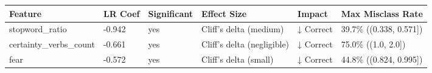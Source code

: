\begin{tabular}{llllll}
\toprule
Feature & LR Coef & Significant & Effect Size & Impact & Max Misclass Rate \\
\midrule
stopword\_ratio & -0.942 & yes & Cliff's delta (medium) & ↓ Correct & 39.7\% ((0.338, 0.571]) \\
certainty\_verbs\_count & -0.661 & yes & Cliff's delta (negligible) & ↓ Correct & 75.0\% ((1.0, 2.0]) \\
fear & -0.572 & yes & Cliff's delta (small) & ↓ Correct & 44.8\% ((0.824, 0.995]) \\
\bottomrule
\end{tabular}
